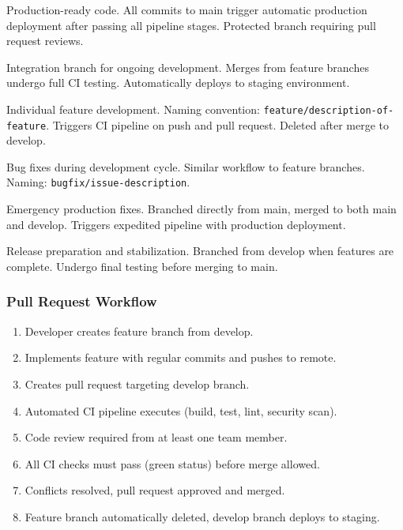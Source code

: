 \documentclass[12pt,a4paper]{article}
\begin{document}
\begin{description}[leftmargin=2em, itemsep=8pt, style=nextline]
    \item[\textbf{main Branch:}] Production-ready code. All commits to main trigger automatic production deployment after passing all pipeline stages. Protected branch requiring pull request reviews.
    
    \item[\textbf{develop Branch:}] Integration branch for ongoing development. Merges from feature branches undergo full CI testing. Automatically deploys to staging environment.
    
    \item[\textbf{feature/* Branches:}] Individual feature development. Naming convention: \texttt{feature/description-of-feature}. Triggers CI pipeline on push and pull request. Deleted after merge to develop.
    
    \item[\textbf{bugfix/* Branches:}] Bug fixes during development cycle. Similar workflow to feature branches. Naming: \texttt{bugfix/issue-description}.
    
    \item[\textbf{hotfix/* Branches:}] Emergency production fixes. Branched directly from main, merged to both main and develop. Triggers expedited pipeline with production deployment.
    
    \item[\textbf{release/* Branches:}] Release preparation and stabilization. Branched from develop when features are complete. Undergo final testing before merging to main.
\end{description}

\subsubsection{Pull Request Workflow}

\begin{enumerate}[leftmargin=2em, itemsep=6pt]
    \item Developer creates feature branch from develop.
    \item Implements feature with regular commits and pushes to remote.
    \item Creates pull request targeting develop branch.
    \item Automated CI pipeline executes (build, test, lint, security scan).
    \item Code review required from at least one team member.
    \item All CI checks must pass (green status) before merge allowed.
    \item Conflicts resolved, pull request approved and merged.
    \item Feature branch automatically deleted, develop branch deploys to staging.
\end{enumerate}
\end{document}

